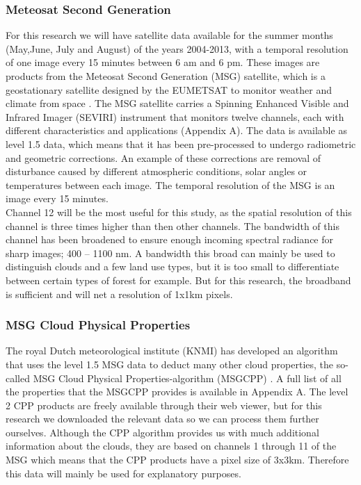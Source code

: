\documentclass{article}
\begin{document}
\subsubsection{Meteosat Second Generation}
For this research we will have satellite data available for the summer months (May,June, July and August) of the years 2004-2013, with a temporal resolution of one image every 15 minutes between 6 am and 6 pm. These images are products from the Meteosat Second Generation (MSG) satellite, which is a geostationary satellite designed by the EUMETSAT to monitor weather and climate from space \parencite[see][]{msg}. The MSG satellite carries a Spinning Enhanced Visible and Infrared Imager (SEVIRI) instrument that monitors twelve channels, each with different characteristics and applications (Appendix A). The data is available as level 1.5 data, which means that it has been pre-processed to undergo radiometric and geometric corrections. An example of these corrections are removal of disturbance caused by different atmospheric conditions, solar angles or temperatures between each image. The temporal resolution of the MSG is an image every 15 minutes.\\

Channel 12 will be the most useful for this study, as the spatial resolution of this channel is three times higher than then other channels. The bandwidth of this channel has been broadened to ensure enough incoming spectral radiance for sharp images; 400 – 1100 nm. A bandwidth this broad can mainly be used to distinguish clouds and a few land use types, but it is too small to differentiate between certain types of forest for example. But for this research, the broadband is sufficient and will net a resolution of 1x1km pixels.

\subsubsection{MSG Cloud Physical Properties}
The royal Dutch meteorological institute (KNMI) has developed an algorithm that uses the level 1.5 MSG data to deduct many other cloud properties, the so-called MSG Cloud Physical Properties-algorithm (MSGCPP) \parencite[see][]{msgcpp}. A full list of all the properties that the MSGCPP provides is available in Appendix A. The level 2 CPP products are freely available through their web viewer, but for this research we downloaded the relevant data so we can process them further ourselves. Although the CPP algorithm provides us with much additional information about the clouds, they are based on channels 1 through 11 of the MSG which means that the CPP products have a pixel size of 3x3km. Therefore this data will mainly be used for explanatory purposes.\\
\end{document}

